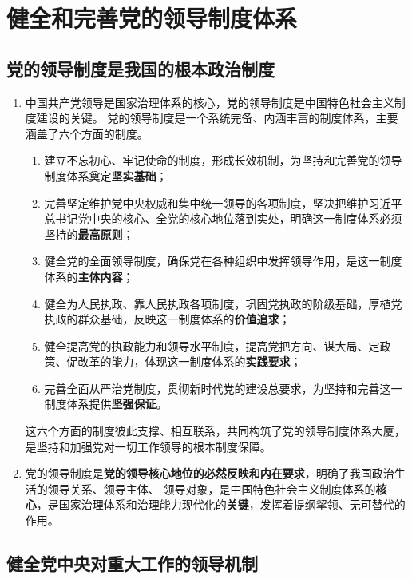 \documentclass[UTF8,10pt]{ctexbook} %
\begin{document}
\section{健全和完善党的领导制度体系}

\subsection{党的领导制度是我国的根本政治制度}


\begin{enumerate}[itemsep=0pt]
    \item 中国共产党领导是国家治理体系的核心，党的领导制度是中国特色社会主义制度建设的关键。
    党的领导制度是一个系统完备、内涵丰富的制度体系，主要涵盖了六个方面的制度。
    \begin{enumerate}[itemsep=0pt, label=(\arabic*)]
        \item 建立不忘初心、牢记使命的制度，形成长效机制，为坚持和完善党的领导制度体系奠定\textbf{坚实基础}；
        \item 完善坚定维护党中央权威和集中统一领导的各项制度，坚决把维护习近平总书记党中央的核心、全党的核心地位落到实处，明确这一制度体系必须坚持的\textbf{最高原则}；
        \item 健全党的全面领导制度，确保党在各种组织中发挥领导作用，是这一制度体系的\textbf{主体内容}；
        \item 健全为人民执政、靠人民执政各项制度，巩固党执政的阶级基础，厚植党执政的群众基础，反映这一制度体系的\textbf{价值追求}；
        \item 健全提高党的执政能力和领导水平制度，提高党把方向、谋大局、定政策、促改革的能力，体现这一制度体系的\textbf{实践要求}；
        \item 完善全面从严治党制度，贯彻新时代党的建设总要求，为坚持和完善这一制度体系提供\textbf{坚强保证}。
    \end{enumerate}
    这六个方面的制度彼此支撑、相互联系，共同构筑了党的领导制度体系大厦，是坚持和加强党对一切工作领导的根本制度保障。
    \item 党的领导制度是\textbf{党的领导核心地位的必然反映和内在要求}，明确了我国政治生活的领导关系、领导主体、
    领导对象，是中国特色社会主义制度体系的\textbf{核心}，是国家治理体系和治理能力现代化的\textbf{关键}，发挥着提纲挈领、无可替代的作用。
\end{enumerate}

\subsection{健全党中央对重大工作的领导机制}
\end{document}
